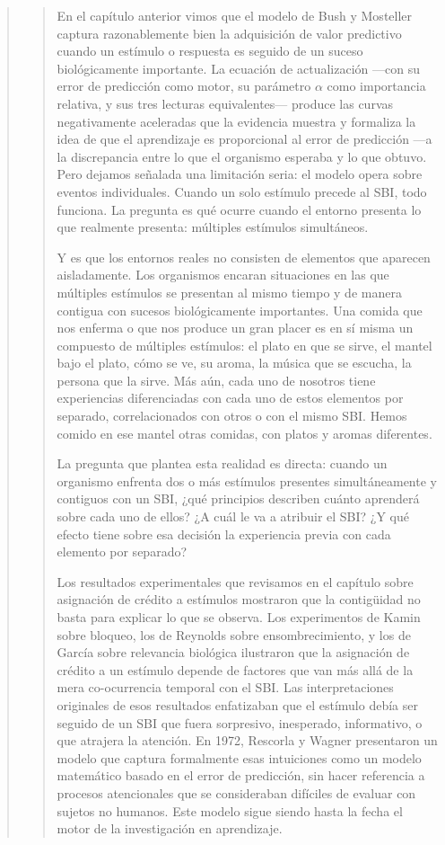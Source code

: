 \documentclass[
  letterpaper,
  DIV=11,
  numbers=noendperiod]{scrreprt}
\begin{document}
\begin{tcolorbox}[enhanced jigsaw, arc=.35mm, bottomrule=.15mm, breakable, colback=white, colframe=quarto-callout-note-color-frame, left=2mm, leftrule=.75mm, opacityback=0, rightrule=.15mm, toprule=.15mm]
\begin{quote}
\begin{quote}
En el capítulo anterior vimos que el modelo de Bush y Mosteller captura
razonablemente bien la adquisición de valor predictivo cuando un
estímulo o respuesta es seguido de un suceso biológicamente importante.
La ecuación de actualización ---con su error de predicción como motor,
su parámetro \(\alpha\) como importancia relativa, y sus tres lecturas
equivalentes--- produce las curvas negativamente aceleradas que la
evidencia muestra y formaliza la idea de que el aprendizaje es
proporcional al error de predicción ---a la discrepancia entre lo que el
organismo esperaba y lo que obtuvo. Pero dejamos señalada una limitación
seria: el modelo opera sobre eventos individuales. Cuando un solo
estímulo precede al SBI, todo funciona. La pregunta es qué ocurre cuando
el entorno presenta lo que realmente presenta: múltiples estímulos
simultáneos.

Y es que los entornos reales no consisten de elementos que aparecen
aisladamente. Los organismos encaran situaciones en las que múltiples
estímulos se presentan al mismo tiempo y de manera contigua con sucesos
biológicamente importantes. Una comida que nos enferma o que nos produce
un gran placer es en sí misma un compuesto de múltiples estímulos: el
plato en que se sirve, el mantel bajo el plato, cómo se ve, su aroma, la
música que se escucha, la persona que la sirve. Más aún, cada uno de
nosotros tiene experiencias diferenciadas con cada uno de estos
elementos por separado, correlacionados con otros o con el mismo SBI.
Hemos comido en ese mantel otras comidas, con platos y aromas
diferentes.

La pregunta que plantea esta realidad es directa: cuando un organismo
enfrenta dos o más estímulos presentes simultáneamente y contiguos con
un SBI, ¿qué principios describen cuánto aprenderá sobre cada uno de
ellos? ¿A cuál le va a atribuir el SBI? ¿Y qué efecto tiene sobre esa
decisión la experiencia previa con cada elemento por separado?

Los resultados experimentales que revisamos en el capítulo sobre
asignación de crédito a estímulos mostraron que la contigüidad no basta
para explicar lo que se observa. Los experimentos de Kamin sobre
bloqueo, los de Reynolds sobre ensombrecimiento, y los de García sobre
relevancia biológica ilustraron que la asignación de crédito a un
estímulo depende de factores que van más allá de la mera co-ocurrencia
temporal con el SBI. Las interpretaciones originales de esos resultados
enfatizaban que el estímulo debía ser seguido de un SBI que fuera
sorpresivo, inesperado, informativo, o que atrajera la atención. En
1972, Rescorla y Wagner presentaron un modelo que captura formalmente
esas intuiciones como un modelo matemático basado en el error de
predicción, sin hacer referencia a procesos atencionales que se
consideraban difíciles de evaluar con sujetos no humanos. Este modelo
sigue siendo hasta la fecha el motor de la investigación en aprendizaje.


\end{quote}
\end{quote}
\end{tcolorbox}
\end{document}
